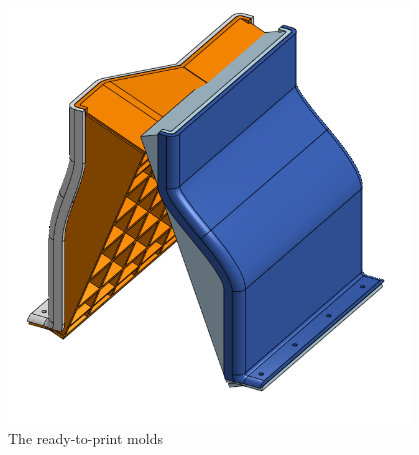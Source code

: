 \begin{figure}[htp]
\centering
\includegraphics[width=0.95\textwidth, angle=0]{Meetings/November/11-27-21/11-22-21_CAD_Figure5 - Nathan Forrer.PNG}
\caption{The ready-to-print molds}
\label{fig:112721_5}
\end{figure}




